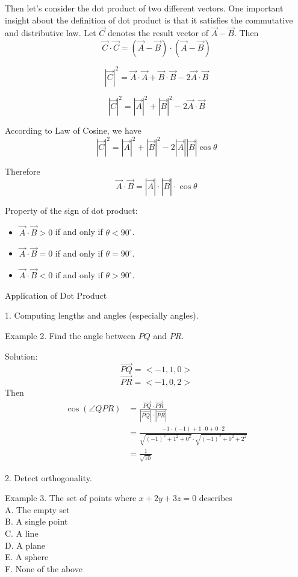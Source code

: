 \documentclass{article}
\begin{document}
Then let's consider the dot product of two different vectors. One important
insight about the definition of dot product is that it satisfies the commutative
and distributive law. Let $\vec{C}$ denotes the result vector of
$\vec{A} - \vec{B}$. Then
\[ \vec{C} \cdot \vec{C} = (\vec{A} - \vec{B}) \cdot (\vec{A} - \vec{B}) \]

\[ |\vec{C}|^2 = \vec{A} \cdot \vec{A} + \vec{B} \cdot \vec{B} - 2 \vec{A} \cdot \vec{B} \]

\[ |\vec{C}|^2 = |\vec{A}|^2 + |\vec{B}|^2 - 2 \vec{A} \cdot \vec{B} \]

According to Law of Cosine, we have
\[ |\vec{C}|^2 = |\vec{A}|^2 + |\vec{B}|^2 - 2|\vec{A}||\vec{B}|\cos\theta \]

Therefore
\[ \vec{A} \cdot \vec{B} = |\vec{A}| \cdot |\vec{B}| \cdot \cos\theta \]

\bigskip

Property of the sign of dot product:
\begin{itemize}
	\item $\vec{A} \cdot \vec{B} > 0$ if and only if $\theta < 90^{\circ}$.
	\item $\vec{A} \cdot \vec{B} = 0$ if and only if $\theta = 90^{\circ}$.
	\item $\vec{A} \cdot \vec{B} < 0$ if and only if $\theta > 90^{\circ}$.
\end{itemize}

\bigskip
Application of Dot Product

1. Computing lengths and angles (especially angles).

Example 2. Find the angle between $PQ$ and $PR$.

Solution:
\[ \vec{PQ} = <-1, 1, 0> \]
\[ \vec{PR} = < -1, 0, 2> \]
Then
\[ 
  \begin{split}
	\cos(\angle QPR)  &= \frac{\vec{PQ} \cdot \vec{PR}}{|\vec{PQ}| \cdot |\vec{PR}|} \\
	                  &= \frac{-1 \cdot (-1) + 1 \cdot 0 + 0 \cdot 2}{\sqrt{(-1)^{2} + 1^{2} + 0^{2}} \cdot \sqrt{(-1)^{2} + 0^{2} + 2^{2}}} \\
	                  &= \frac{1}{\sqrt{10}}
  \end{split}
\]

2. Detect orthogonality.

Example 3. The set of points where $x + 2y + 3z = 0$ describes \\
A. The empty set \\
B. A single point \\
C. A line \\
D. A plane \\
E. A sphere \\
F. None of the above
\end{document}
